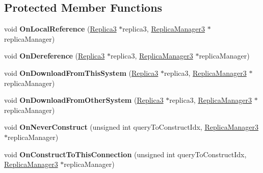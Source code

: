 \subsection*{Protected Member Functions}
\begin{DoxyCompactItemize}
\item 
\hypertarget{class_rak_net_1_1_connection___r_m3_af3fbf9354ca1c29d5c8d6dc1d55cf45a}{void {\bfseries On\-Local\-Reference} (\hyperlink{class_rak_net_1_1_replica3}{Replica3} $\ast$replica3, \hyperlink{class_rak_net_1_1_replica_manager3}{Replica\-Manager3} $\ast$replica\-Manager)}\label{class_rak_net_1_1_connection___r_m3_af3fbf9354ca1c29d5c8d6dc1d55cf45a}

\item 
\hypertarget{class_rak_net_1_1_connection___r_m3_a34de646c18792e566c3ac0b11b7e4ffb}{void {\bfseries On\-Dereference} (\hyperlink{class_rak_net_1_1_replica3}{Replica3} $\ast$replica3, \hyperlink{class_rak_net_1_1_replica_manager3}{Replica\-Manager3} $\ast$replica\-Manager)}\label{class_rak_net_1_1_connection___r_m3_a34de646c18792e566c3ac0b11b7e4ffb}

\item 
\hypertarget{class_rak_net_1_1_connection___r_m3_a8d429807bb55c853604e4a29089b722b}{void {\bfseries On\-Download\-From\-This\-System} (\hyperlink{class_rak_net_1_1_replica3}{Replica3} $\ast$replica3, \hyperlink{class_rak_net_1_1_replica_manager3}{Replica\-Manager3} $\ast$replica\-Manager)}\label{class_rak_net_1_1_connection___r_m3_a8d429807bb55c853604e4a29089b722b}

\item 
\hypertarget{class_rak_net_1_1_connection___r_m3_a68ae8c4d97516ab1b1760cb823763cfd}{void {\bfseries On\-Download\-From\-Other\-System} (\hyperlink{class_rak_net_1_1_replica3}{Replica3} $\ast$replica3, \hyperlink{class_rak_net_1_1_replica_manager3}{Replica\-Manager3} $\ast$replica\-Manager)}\label{class_rak_net_1_1_connection___r_m3_a68ae8c4d97516ab1b1760cb823763cfd}

\item 
\hypertarget{class_rak_net_1_1_connection___r_m3_af5829ce255b676ac0f3fb2010da69f08}{void {\bfseries On\-Never\-Construct} (unsigned int query\-To\-Construct\-Idx, \hyperlink{class_rak_net_1_1_replica_manager3}{Replica\-Manager3} $\ast$replica\-Manager)}\label{class_rak_net_1_1_connection___r_m3_af5829ce255b676ac0f3fb2010da69f08}

\item 
\hypertarget{class_rak_net_1_1_connection___r_m3_acf677b4bee728e8523b1f6abf861ebee}{void {\bfseries On\-Construct\-To\-This\-Connection} (unsigned int query\-To\-Construct\-Idx, \hyperlink{class_rak_net_1_1_replica_manager3}{Replica\-Manager3} $\ast$replica\-Manager)}\label{class_rak_net_1_1_connection___r_m3_acf677b4bee728e8523b1f6abf861ebee}


\end{DoxyCompactItemize}
